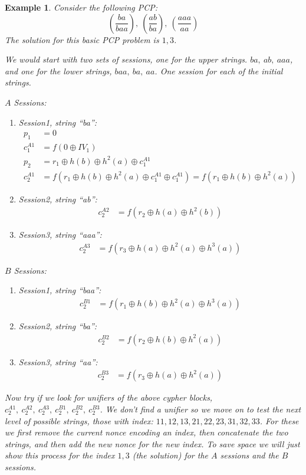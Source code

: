 \documentclass[11pt,twoside,a4paper]{article}
\newtheorem{example}{Example}
\begin{document}
\begin{example}
	Consider the following PCP:
	\[
	(\frac{ba}{baa}),~(\frac{ab}{ba}),~(\frac{aaa}{aa})
	\]
	The solution for this basic PCP problem is $1,3$.
	
	We would start with two sets of sessions, one for the 
	upper strings. $ba, ~ab, ~aaa$, and one for the lower
	strings, $baa, ~ba, ~aa$. One session for each of the initial strings. 
	
	\noindent
	$A$ Sessions:
	\begin{enumerate}
		\item Session1, string ``ba'':
		\begin{align*}
		p_1 &= 0\\
		c^{A1}_1 &= f(0 \oplus IV_{1})\\
		p_2 &= r_1 \oplus h(b) \oplus h^2(a) \oplus c^{A1}_1\\
		c^{A1}_2 &= f(r_1 \oplus h(b) \oplus h^2(a) \oplus c^{A1}_1 \oplus c^{A1}_1) = f(r_1 \oplus h(b) \oplus h^2(a))
		\end{align*}
		\item Session2, string ``ab'':
		\begin{align*}
			c^{A2}_2 &=f(r_2 \oplus h(a) \oplus h^2(b))
		\end{align*}
		\item Session3, string ``aaa'':
		\begin{align*}
			c^{A3}_2 &=f(r_3 \oplus h(a) \oplus h^2(a) \oplus h^3(a))
		\end{align*}
	\end{enumerate}
	
	\noindent
	$B$ Sessions:
\begin{enumerate}
	\item Session1, string ``baa'':
	\begin{align*}
	c^{B1}_2 &= f(r_1 \oplus h(b) \oplus h^2(a) \oplus h^3(a))
	\end{align*}
	\item Session2, string ``ba'':
	\begin{align*}
	c^{B2}_2 &= f(r_2 \oplus h(b) \oplus h^2(a))
	\end{align*}
	\item Session3, string ``aa'':
	\begin{align*}
	c^{B3}_2 &= f(r_3 \oplus h(a) \oplus h^2(a))
	\end{align*}
\end{enumerate}
 
Now try if we look for unifiers of the above cypher blocks, 
$c^{A1}_2, ~c^{A2}_2, ~c^{A3}_2, ~c^{B1}_2, ~c^{B2}_2, ~c^{B3}_2$.
We don't find a unifier so we move on to test the next level of
possible strings, those with index: $11, 12, 13, 21, 22, 23, 31, 32, 33$. For these we first remove the current nonce encoding an index, 
then concatenate the two strings, and then add the new nonce for the
new index.  To save space we will just show this process for 
the index $1,3$ (the solution) for the $A$ sessions and the $B$ sessions.


\end{example}
\end{document}
